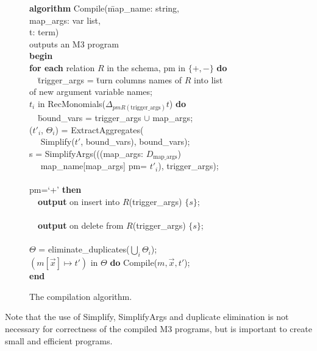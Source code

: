 \begin{figure}
\begin{tabbing}
{\bf algorithm} Compile(\=map\_name: string, \\
                  \>map\_args: var list, \\
                  \>t: term) \\
outputs an M3 program \\
{\bf begin} \\
{\bf for each} relation $R$ in the schema,
               pm in $\{+,-\}$ {\bf do} \\
~~\=
  trigger\_args = \=turn columns names of $R$ into list \\
\>               \>of new argument variable names; \\
 $t_i$ in
        RecMonomials($\Delta_{pm R(\mathrm{trigger\_args})} t$) {\bf do} \\
\>~~\=bound\_vars = trigger\_args $\cup$ map\_args; \\
\>\>($t'_i$, $\Theta_i$) = ExtractAggregates( \\
\>\>~~      Simplify($t'$, bound\_vars), bound\_vars); \\
\>\>s = SimplifyArgs(((map\_args: $D_{\mathrm{map\_args}}$) \\
\>\>~~       map\_name[map\_args] pm= $t'_i$), trigger\_args); \\
\\
\> pm=`+' {\bf then} \\
\>\>~~{\bf output} on insert into $R$(trigger\_args) $\{s\}$; \\
\> \\
\>\>~~{\bf output} on delete from $R$(trigger\_args) $\{s\}$; \\
\\
\>$\Theta$ = eliminate\_duplicates($\bigcup_i \Theta_i$); \\
 $(m[\vec{x}] \mapsto t')$ in $\Theta$ {\bf do}
                 Compile($m, \vec{x}, t'$); \\
{\bf end}
\end{tabbing}

\vspace{-6mm}

\caption{The compilation algorithm.}
\label{fig:compilation-algo}
\end{figure}


Note that the use of Simplify, SimplifyArgs and duplicate elimination
is not necessary for correctness of the compiled M3 programs, but is important
to create small and efficient programs.


